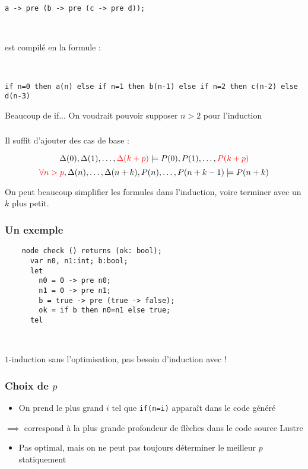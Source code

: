 \documentclass[18pt]{beamer}
\begin{document}
\section{\optimisation}
\begin{frame}[fragile]
	\frametitle{\optimisation}
	
	\texttt{a -> pre (b -> pre (c -> pre d));}
	
	\
	
	est compilé en la formule :
	
	\
	
	\texttt{if n=0 then a(n) else if n=1 then b(n-1) else if n=2 then c(n-2) else d(n-3)}
	
	\bigskip
	
	Beaucoup de if... On voudrait pouvoir supposer $n>2$ pour l'induction
\end{frame}
\begin{frame}
	\frametitle{\optimisation}
	Il suffit d'ajouter des cas de base :
	
	$$\Delta(0), \Delta(1), \ldots, \color{red}\Delta(k+p)\color{black} \models P(0), P(1), \ldots, \color{red}P(k+p)\color{black}$$
	$$\color{red}\forall n>p\color{black}, {\Delta(n), \ldots, \Delta(n+k), P(n), \ldots, P(n+k-1) \models P(n+k)}$$
	
	On peut beaucoup simplifier les formules dans l'induction, voire terminer avec un $k$ plus petit.
\end{frame}
\begin{frame}[fragile]
	\frametitle{Un exemple}
	\begin{lstlisting}
	node check () returns (ok: bool);
	  var n0, n1:int; b:bool;
	  let
	    n0 = 0 -> pre n0;
	    n1 = 0 -> pre n1;
	    b = true -> pre (true -> false);
	    ok = if b then n0=n1 else true;
	  tel
	\end{lstlisting}
	
	\
	
	$1$-induction sans l'optimisation, pas besoin d'induction avec !
\end{frame}
\begin{frame}
	\frametitle{Choix de $p$}
	\begin{itemize}
	\item On prend le plus grand $i$ tel que \texttt{if(n=i)} apparaît dans le code généré
	\end{itemize}
	$\implies$ correspond à la plus grande profondeur de flèches dans le code source Lustre
	
	\begin{itemize}
		\item Pas optimal, mais on ne peut pas toujours déterminer le meilleur $p$ statiquement
	\end{itemize}
\end{frame}
\end{document}
